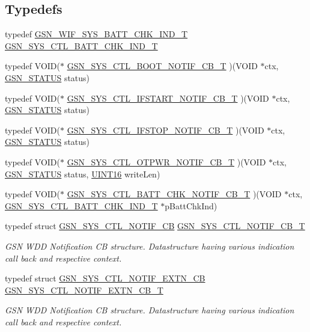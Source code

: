 \subsection*{Typedefs}
\begin{DoxyCompactItemize}
\item 
typedef \hyperlink{a00345}{GSN\_\-WIF\_\-SYS\_\-BATT\_\-CHK\_\-IND\_\-T} \hyperlink{a00592_a641249d44e4f0127d70dd3bdd2d03ef7}{GSN\_\-SYS\_\-CTL\_\-BATT\_\-CHK\_\-IND\_\-T}
\item 
typedef VOID($\ast$ \hyperlink{a00592_a0000f73c2f639831f9499e5106c70b4f}{GSN\_\-SYS\_\-CTL\_\-BOOT\_\-NOTIF\_\-CB\_\-T} )(VOID $\ast$ctx, \hyperlink{a00660_gada5951904ac6110b1fa95e51a9ddc217}{GSN\_\-STATUS} status)
\item 
typedef VOID($\ast$ \hyperlink{a00592_a2378a15a57410fa717b24a73398855f4}{GSN\_\-SYS\_\-CTL\_\-IFSTART\_\-NOTIF\_\-CB\_\-T} )(VOID $\ast$ctx, \hyperlink{a00660_gada5951904ac6110b1fa95e51a9ddc217}{GSN\_\-STATUS} status)
\item 
typedef VOID($\ast$ \hyperlink{a00592_a04addc1c242f2d0a18d2a1f21b8379b1}{GSN\_\-SYS\_\-CTL\_\-IFSTOP\_\-NOTIF\_\-CB\_\-T} )(VOID $\ast$ctx, \hyperlink{a00660_gada5951904ac6110b1fa95e51a9ddc217}{GSN\_\-STATUS} status)
\item 
typedef VOID($\ast$ \hyperlink{a00592_a0f838274b37f0a1f10e78dca5fcc9e80}{GSN\_\-SYS\_\-CTL\_\-OTPWR\_\-NOTIF\_\-CB\_\-T} )(VOID $\ast$ctx, \hyperlink{a00660_gada5951904ac6110b1fa95e51a9ddc217}{GSN\_\-STATUS} status, \hyperlink{a00660_ga09f1a1fb2293e33483cc8d44aefb1eb1}{UINT16} writeLen)
\item 
typedef VOID($\ast$ \hyperlink{a00592_af97ab705a1dd2c6de5dfc45aab9d47fe}{GSN\_\-SYS\_\-CTL\_\-BATT\_\-CHK\_\-NOTIF\_\-CB\_\-T} )(VOID $\ast$ctx, \hyperlink{a00345}{GSN\_\-SYS\_\-CTL\_\-BATT\_\-CHK\_\-IND\_\-T} $\ast$pBattChkInd)
\item 
typedef struct \hyperlink{a00253}{GSN\_\-SYS\_\-CTL\_\-NOTIF\_\-CB} \hyperlink{a00677_ga1afa369ae85e712e56f39e318e3dfb26}{GSN\_\-SYS\_\-CTL\_\-NOTIF\_\-CB\_\-T}
\begin{DoxyCompactList}\small\item\em GSN WDD Notification CB structure. Datastructure having various indication call back and respective context. \end{DoxyCompactList}\item 
typedef struct \hyperlink{a00254}{GSN\_\-SYS\_\-CTL\_\-NOTIF\_\-EXTN\_\-CB} \hyperlink{a00677_ga3fdb6c5df43ccafac3c0d58243f572b0}{GSN\_\-SYS\_\-CTL\_\-NOTIF\_\-EXTN\_\-CB\_\-T}
\begin{DoxyCompactList}\small\item\em GSN WDD Notification CB structure. Datastructure having various indication call back and respective context. \end{DoxyCompactList}\item 

\end{DoxyCompactItemize}
